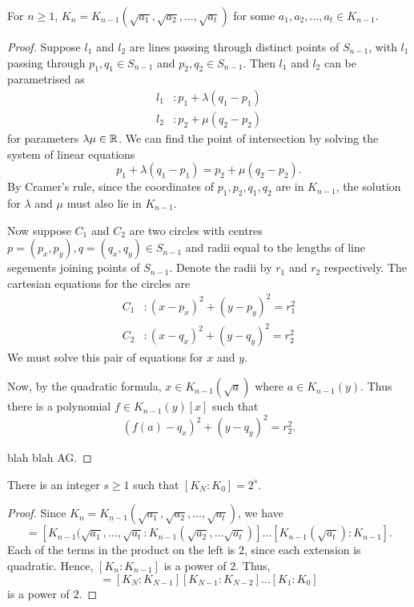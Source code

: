 \documentclass{unswmaths}
\begin{document}
\begin{theorem}
    For $n \geq 1$, $K_n = K_{n-1}(\sqrt{a_1},\sqrt{a_2},\ldots,\sqrt{a_t})$
    for some $a_1,a_2,\ldots, a_t \in K_{n-1}$.
\end{theorem}
\begin{proof}
    Suppose $l_1$ and $l_2$ are lines passing through distinct points
    of $S_{n-1}$, with $l_1$ passing through $p_1,q_1 \in S_{n-1}$
    and $p_2,q_2\in S_{n-1}$. Then $l_1$ and $l_2$ can be parametrised as
    \begin{align*}
        l_1&: p_1+\lambda(q_1-p_1)\\
        l_2&: p_2+\mu(q_2-p_2)
    \end{align*}
    for parameters $\lambda \mu \in \mathbb{R}$. We can find the point of intersection
    by solving the system of linear equations
    \begin{equation*}
        p_1+\lambda(q_1-p_1) = p_2+\mu(q_2-p_2).
    \end{equation*}
    By Cramer's rule, since the coordinates of $p_1,p_2,q_1,q_2$
    are in $K_{n-1}$, the solution for $\lambda$
    and $\mu$ must also lie in $K_{n-1}$.
    
    Now suppose $C_1$ and $C_2$ are two circles with centres
    $p = (p_x,p_y),q = (q_x,q_y) \in S_{n-1}$ and radii equal to the lengths of line
    segements joining points of $S_{n-1}$. Denote the radii
    by $r_1$ and $r_2$ respectively. The cartesian equations
    for the circles are
    \begin{align*}
        C_1&: (x-p_x)^2+(y-p_y)^2 = r_1^2\\
        C_2&: (x-q_x)^2+(y-q_y)^2 = r_2^2
    \end{align*}
    We must solve this pair of equations for $x$ and $y$.
    
    Now, by the quadratic formula, $x \in K_{n-1}(\sqrt{a})$
    where $a \in K_{n-1}(y)$. Thus there is a polynomial $f \in K_{n-1}(y)[x]$
    such that
    \begin{equation*}
        (f(a)-q_x)^2+(y-q_y)^2 = r_2^2.
    \end{equation*}
    
    blah blah AG.
    
\end{proof}

\begin{lemma}
    There is an integer $s \geq 1$ such that $[K_N:K_0] = 2^s$.
\end{lemma}
\begin{proof}
    Since $K_n = K_{n-1}(\sqrt{a_1},\sqrt{a_2},\ldots,\sqrt{a_t})$, we have
    \begin{equation*}
        [K_n:K_{n-1}] = [K_{n-1}(\sqrt{a_1},\ldots,\sqrt{a_t}:K_{n-1}(\sqrt{a_2},\ldots\sqrt{a_t})]\ldots[K_{n-1}(\sqrt{a_t}):K_{n-1}].
    \end{equation*}
    Each of the terms in the product on the left is $2$, since each extension is quadratic. Hence, $[K_n:K_{n-1}]$ is a power of $2$.
    Thus,
    \begin{equation*}
        [K_N:K_0] = [K_N:K_{N-1}][K_{N-1}:K_{N-2}]\ldots[K_1:K_0]
    \end{equation*}
    is a power of $2$.
\end{proof}
\end{document}
